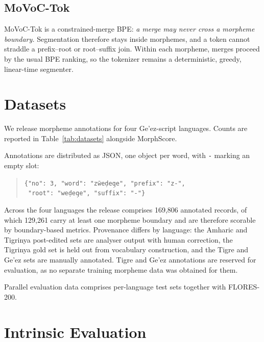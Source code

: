 \documentclass[11pt]{article}
\begin{document}
\subsection{MoVoC-Tok}
\label{sec:movoctok}

MoVoC-Tok is a constrained-merge BPE: \emph{a merge may never cross a morpheme
boundary.} Segmentation therefore stays inside morphemes, and a token cannot
straddle a prefix--root or root--suffix join. Within each morpheme, merges
proceed by the usual BPE ranking, so the tokenizer remains a deterministic,
greedy, linear-time segmenter.

\section{Datasets}
\label{sec:datasets}

We release morpheme annotations for four Ge'ez-script languages. Counts are
reported in Table~\ref{tab:datasets} alongside MorphScore.

Annotations are distributed as JSON, one object per word, with \texttt{-}
marking an empty slot:

\begin{quote}
\texttt{\{"no": 3, "word": "z\=we\d{d}e\d{q}e", "prefix": "z-",}\\
\texttt{ "root": "we\d{d}e\d{q}e", "suffix": "-"\}}
\end{quote}

Across the four languages the release comprises 169,806 annotated records, of
which 129,261 carry at least one morpheme boundary and are therefore scorable
by boundary-based metrics. Provenance differs by language: the Amharic and
Tigrinya post-edited sets are analyser output with human correction, the
Tigrinya gold set is held out from vocabulary construction, and the Tigre and
Ge'ez sets are manually annotated. Tigre and Ge'ez annotations are reserved for
evaluation, as no separate training morpheme data was obtained for them.

Parallel evaluation data comprises per-language test sets together with
FLORES-200.

\section{Intrinsic Evaluation}
\label{sec:intrinsic}
\end{document}
